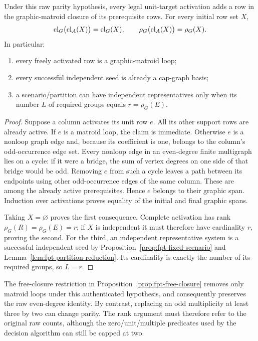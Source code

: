 \begin{theorem}
\label{thm:fpt-parity-rank}
Under this raw parity hypothesis, every legal unit-target activation
adds a row in the graphic-matroid closure of its prerequisite rows.
For every initial row set $X$,
\[
  \operatorname{cl}_{G}\bigl(\operatorname{cl}_A(X)\bigr)
                 =\operatorname{cl}_{G}(X),
  \qquad
  \rho_G\bigl(\operatorname{cl}_A(X)\bigr)=\rho_G(X).
\]
In particular:
\begin{enumerate}
\item every freely activated row is a graphic-matroid loop;
\item every successful independent seed is already a cap-graph basis;
\item a scenario/partition can have independent representatives only
      when its number $L$ of required groups equals
      $r=\rho_G(E)$.
\end{enumerate}
\end{theorem}
\begin{proof}
Suppose a column activates its unit row $e$. All its other support rows
are already active. If $e$ is a matroid loop, the claim is immediate.
Otherwise $e$ is a nonloop graph edge and, because its coefficient is
one, belongs to the column's odd-occurrence edge set. Every nonloop edge
in an even-degree finite multigraph lies on a cycle: if it were a bridge,
the sum of vertex degrees on one side of that bridge would be odd.
Removing $e$ from such a cycle leaves a path between its endpoints using
other odd-occurrence edges of the same column. These are among the
already active prerequisites. Hence $e$ belongs to their graphic span.
Induction over activations proves equality of the initial and final
graphic spans.

Taking $X=\varnothing$ proves the first consequence. Complete activation
has rank $\rho_G(R)=\rho_G(E)=r$; if $X$ is independent it must therefore have
cardinality $r$, proving the second. For the third, an independent
representative system is a successful independent seed by
Proposition~\ref{prop:fpt-fixed-scenario} and
Lemma~\ref{lem:fpt-partition-reduction}. Its cardinality is exactly the
number of its required groups, so $L=r$.
\end{proof}

The free-closure restriction in
Proposition~\ref{prop:fpt-free-closure} removes only matroid loops under
this authenticated hypothesis, and consequently preserves the raw
even-degree identity. By contrast, replacing an odd multiplicity at
least three by two can change parity. The rank argument must therefore
refer to the original raw counts, although the zero/unit/multiple
predicates used by the decision algorithm can still be capped at two.

